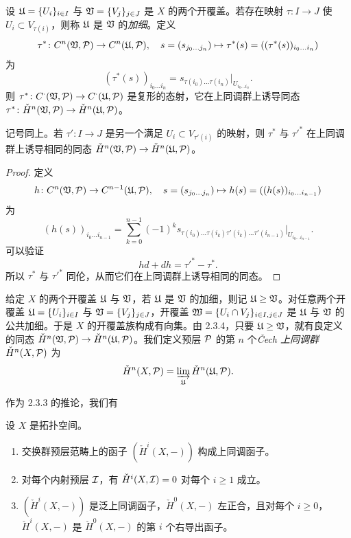 设 $\mathfrak{U}=\{U_i\}_{i\in I}$ 与 $\mathfrak{V}=\{V_j\}_{j\in J}$ 是 $X$ 的两个开覆盖。若存在映射 $\tau\colon I\to J$ 使 $U_i\subset V_{\tau(i)}$，则称 $\mathfrak{U}$ 是 $\mathfrak{V}$ 的\emph{加细}。定义
\[
\tau^*\colon C^n(\mathfrak{V},\mathcal{P})\to C^n(\mathfrak{U},\mathcal{P}),\quad s=(s_{j_0\dots j_n})\mapsto \tau^*(s)=((\tau^*(s))_{i_0\dots i_n})
\]
为
\[
(\tau^*(s))_{i_0\dots i_n}=s_{\tau(i_0)\dots\tau(i_n)}|_{U_{i_0\dots i_n}}.
\]
则 $\tau^*\colon C^\cdot(\mathfrak{V},\mathcal{P})\to C^\cdot(\mathfrak{U},\mathcal{P})$ 是复形的态射，它在上同调群上诱导同态 $\tau^*\colon\check{H}^n(\mathfrak{V},\mathcal{P})\to\check{H}^n(\mathfrak{U},\mathcal{P})$。

\begin{proposition}\label{it:2.3.4}
记号同上。若 $\tau'\colon I\to J$ 是另一个满足 $U_i\subset V_{\tau'(i)}$ 的映射，则 $\tau^*$ 与 $\tau'^*$ 在上同调群上诱导相同的同态 $\check{H}^n(\mathfrak{V},\mathcal{P})\to\check{H}^n(\mathfrak{U},\mathcal{P})$。
\end{proposition}

\begin{proof}
定义
\[
h\colon C^n(\mathfrak{V},\mathcal{P})\to C^{n-1}(\mathfrak{U},\mathcal{P}),\quad s=(s_{j_0\dots j_n})\mapsto h(s)=((h(s))_{i_0\dots i_{n-1}})
\]
为
\[
(h(s))_{i_0\dots i_{n-1}}=\sum_{k=0}^{n-1}(-1)^k s_{\tau(i_0)\dots\tau(i_k)\tau'(i_k)\dots\tau'(i_{n-1})}|_{U_{i_0\dots i_{n-1}}}.
\]
可以验证
\[
hd+dh=\tau'^*-\tau^*.
\]
所以 $\tau^*$ 与 $\tau'^*$ 同伦，从而它们在上同调群上诱导相同的同态。
\end{proof}

给定 $X$ 的两个开覆盖 $\mathfrak{U}$ 与 $\mathfrak{V}$，若 $\mathfrak{U}$ 是 $\mathfrak{V}$ 的加细，则记 $\mathfrak{U}\ge\mathfrak{V}$。对任意两个开覆盖 $\mathfrak{U}=\{U_i\}_{i\in I}$ 与 $\mathfrak{V}=\{V_j\}_{j\in J}$，开覆盖 $\mathfrak{W}=\{U_i\cap V_j\}_{i\in I,j\in J}$ 是 $\mathfrak{U}$ 与 $\mathfrak{V}$ 的公共加细。于是 $X$ 的开覆盖族构成有向集。由 2.3.4，只要 $\mathfrak{U}\ge\mathfrak{V}$，就有良定义的同态 $\check{H}^n(\mathfrak{V},\mathcal{P})\to\check{H}^n(\mathfrak{U},\mathcal{P})$。我们定义预层 $\mathcal{P}$ 的第 $n$ 个\emph{\v{C}ech 上同调群} $\check{H}^n(X,\mathcal{P})$ 为
\[
\check{H}^n(X,\mathcal{P})=\varinjlim_{\mathfrak{U}}\check{H}^n(\mathfrak{U},\mathcal{P}).
\]

作为 2.3.3 的推论，我们有

\begin{corollary}\label{it:2.3.5}
设 $X$ 是拓扑空间。
\begin{enumerate}[label=(\roman*),leftmargin=2.8em]
  \item 交换群预层范畴上的函子 $(\check{H}^i(X,-))$ 构成上同调函子。
  \item 对每个内射预层 $\mathcal{I}$，有 $\check{H}^i(X,\mathcal{I})=0$ 对每个 $i\ge 1$ 成立。
  \item $(\check{H}^i(X,-))$ 是泛上同调函子，$\check{H}^0(X,-)$ 左正合，且对每个 $i\ge 0$，$\check{H}^i(X,-)$ 是 $\check{H}^0(X,-)$ 的第 $i$ 个右导出函子。
\end{enumerate}
\end{corollary}

